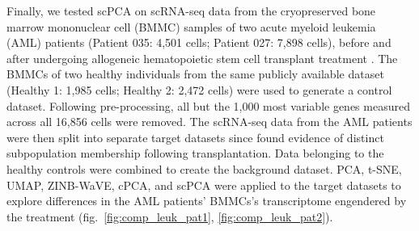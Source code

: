 Finally, we tested scPCA on scRNA-seq data from the cryopreserved bone marrow mononuclear cell (BMMC) samples of two acute myeloid leukemia (AML) patients (Patient 035: 4,501 cells; Patient 027: 7,898 cells), before and after undergoing allogeneic hematopoietic stem cell transplant treatment \cite{Zheng2017}. The BMMCs of two healthy individuals from the same publicly available dataset (Healthy 1: 1,985 cells; Healthy 2: 2,472 cells) were used to generate a control dataset. Following pre-processing, all but the 1,000 most variable genes measured across all 16,856 cells were removed. The scRNA-seq data from the AML patients were then split into separate target datasets since \citet{Zheng2017} found evidence of distinct subpopulation membership following transplantation. Data belonging to the healthy controls were combined to create the background dataset. PCA, t-SNE, UMAP, ZINB-WaVE, cPCA, and scPCA were applied to the target datasets to explore differences in the AML patients' BMMCs's transcriptome engendered by the treatment (fig.~\ref{fig:comp_leuk_pat1}, \ref{fig:comp_leuk_pat2}).

